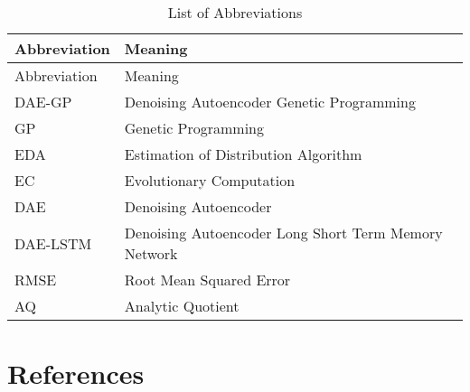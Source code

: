 \documentclass[
  11pt,
]{article}
\begin{document}
\begin{longtable}[]{@{}ll@{}}
\caption{\label{tab:abbreviations}List of Abbreviations}\tabularnewline
\toprule\noalign{}
Abbreviation & Meaning \\
\midrule\noalign{}
\endfirsthead
\toprule\noalign{}
Abbreviation & Meaning \\
\midrule\noalign{}
\endhead
\bottomrule\noalign{}
\endlastfoot
DAE-GP & Denoising Autoencoder Genetic Programming \\
GP & Genetic Programming \\
EDA & Estimation of Distribution Algorithm \\
EC & Evolutionary Computation \\
DAE & Denoising Autoencoder \\
DAE-LSTM & Denoising Autoencoder Long Short Term Memory Network \\
RMSE & Root Mean Squared Error \\
AQ & Analytic Quotient \\
\end{longtable}

\newpage

\hypertarget{III}{%
\section*{References}\label{III}}
\end{document}
